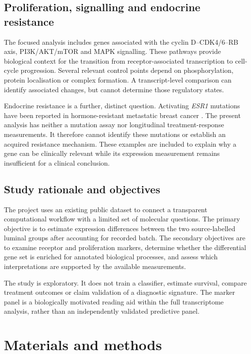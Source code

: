 \documentclass[11pt,a4paper]{article}
\newcommand{\gene}[1]{\textit{#1}}
\begin{document}
\subsection{Proliferation, signalling and endocrine resistance}
The focused analysis includes genes associated with the cyclin D--CDK4/6--RB axis, PI3K/AKT/mTOR and MAPK signalling. These pathways provide biological context for the transition from receptor-associated transcription to cell-cycle progression. Several relevant control points depend on phosphorylation, protein localisation or complex formation. A transcript-level comparison can identify associated changes, but cannot determine those regulatory states.

Endocrine resistance is a further, distinct question. Activating \gene{ESR1} mutations have been reported in hormone-resistant metastatic breast cancer \cite{Toy2013,Robinson2013}. The present analysis has neither a mutation assay nor longitudinal treatment-response measurements. It therefore cannot identify these mutations or establish an acquired resistance mechanism. These examples are included to explain why a gene can be clinically relevant while its expression measurement remains insufficient for a clinical conclusion.

\subsection{Study rationale and objectives}
The project uses an existing public dataset to connect a transparent computational workflow with a limited set of molecular questions. The primary objective is to estimate expression differences between the two source-labelled luminal groups after accounting for recorded batch. The secondary objectives are to examine receptor and proliferation markers, determine whether the differential gene set is enriched for annotated biological processes, and assess which interpretations are supported by the available measurements.

The study is exploratory. It does not train a classifier, estimate survival, compare treatment outcomes or claim validation of a diagnostic signature. The marker panel is a biologically motivated reading aid within the full transcriptome analysis, rather than an independently validated predictive panel.

\section{Materials and methods}
\end{document}
